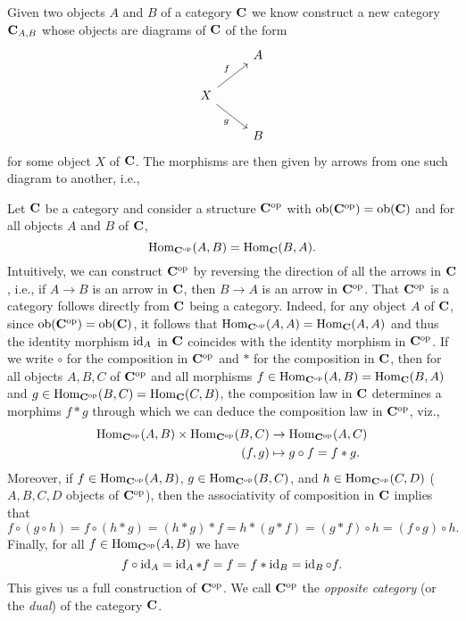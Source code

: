 \begin{example}
    Given two objects \(A\) and \(B\) of a category \(\mathbf{C}\) we know
    construct a new category \(\mathbf{C}_{A, B}\) whose objects are diagrams of
    \(\mathbf{C}\) of the form
    \[
        \begin{tikzcd}
                    & A \\
        X \arrow[rd, "g"'] \arrow[ru, "f"] &   \\
                    & B
        \end{tikzcd}
    \]
    for some object \(X\) of \(\mathbf{C}\). The morphisms are then given by
    arrows from one such diagram to another, i.e.,
    
\end{example}

\begin{example}
    \label{ex:opposite-category}
    Let \(\mathbf{C}\) be a category and consider a structure \(\mathbf{C}^{\mathrm{op}}\)
    with \(\operatorname{ob}(\mathbf{\mathbf{C}^{\mathrm{op}}}) = \operatorname{ob}(\mathbf{\mathbf{C}})\) and for all objects \(A\) and
    \(B\) of \(\mathbf{C}\),
    \[
        \operatorname{Hom}_{\mathbf{C}^{\mathrm{op}}}(A, B) = \operatorname{Hom}_{\mathbf{C}}(B, A).
    \]
    Intuitively, we can construct \(\mathbf{C}^{\mathrm{op}}\) by reversing the direction of
    all the arrows in \(\mathbf{C}\), i.e., if \(A \to B\) is an arrow in
    \(\mathbf{C}\), then \(B \to A\) is an arrow in \(\mathbf{C}^{\mathrm{op}}\). That
    \(\mathbf{C}^{\mathrm{op}}\) is a category follows directly from \(\mathbf{C}\) being a
    category. Indeed, for any object \(A\) of \(\mathbf{C}\), since
    \(\operatorname{ob}(\mathbf{\mathbf{C}^{\mathrm{op}}}) = \operatorname{ob}(\mathbf{\mathbf{C}})\), it follows that
    \(\operatorname{Hom}_{\mathbf{C}^{\mathrm{op}}}(A, A) = \operatorname{Hom}_{\mathbf{C}}(A, A)\) and thus the identity
    morphism \(\operatorname{id}_A\) in \(\mathbf{C}\) coincides with the identity morphism in
    \(\mathbf{C}^{\mathrm{op}}\). If we write \(\circ\) for the composition in
    \(\mathbf{C}^{\mathrm{op}}\) and \(*\) for the composition in \(\mathbf{C}\), then for all
    objects \(A, B, C\) of \(\mathbf{C}^{\mathrm{op}}\) and all morphisms \(f \in
    \operatorname{Hom}_{\mathbf{C}^{\mathrm{op}}}(A, B) = \operatorname{Hom}_{\mathbf{C}}(B,A)\) and \(g \in
    \operatorname{Hom}_{\mathbf{C}^{\mathrm{op}}}(B, C) = \operatorname{Hom}_{\mathbf{C}}(C, B)\), the composition law in
    \(\mathbf{C}\) determines a morphims \(f * g\) through which we can deduce the
    composition law in \(\mathbf{C}^{\mathrm{op}}\), viz.,
    \begin{align*}
        \operatorname{Hom}_{\mathbf{C}^{\mathrm{op}}}(A, B) \times \operatorname{Hom}_{\mathbf{C}^{\mathrm{op}}}(B, C) &\to \operatorname{Hom}_{\mathbf{C}^{\mathrm{op}}}(A, C)\\
        (f, g) &\mapsto g \circ f = f * g.
    \end{align*}
    Moreover, if \(f \in \operatorname{Hom}_{\mathbf{C}^{\mathrm{op}}}(A, B)\), \(g \in
    \operatorname{Hom}_{\mathbf{C}^{\mathrm{op}}}(B, C)\), and \(h \in \operatorname{Hom}_{\mathbf{C}^{\mathrm{op}}}(C, D)\) (\(A,
    B, C, D\) objects of \(\mathbf{C}^{\mathrm{op}}\)), then the associativity of
    composition in \(\mathbf{C}\) implies that
    \[ 
        f \circ (g \circ h) = f \circ (h * g) = (h * g) * f = h * (g * f) = (g * f) \circ h = (f \circ g) \circ h.
    \]
    Finally, for all \(f \in \operatorname{Hom}_{\mathbf{C}^{\mathrm{op}}}(A, B)\) we have
    \[
        f \circ \operatorname{id}_A = \operatorname{id}_A * f = f = f * \operatorname{id}_B = \operatorname{id}_B \circ f.
    \]
    This gives us a full construction of \(\mathbf{C}^{\mathrm{op}}\). We call
    \(\mathbf{C}^{\mathrm{op}}\) the \emph{opposite category} (or the \emph{dual}) of the
    category \(\mathbf{C}\).
\end{example}


